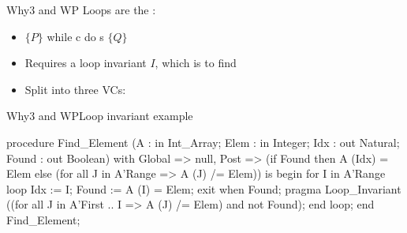 \documentclass{beamer}
\begin{document}
\begin{frame}{Why3 and WP}
  Loops are the :
  \begin{itemize}
  \item $\{ P \}$ while c do s $\{ Q \}$
  \pause
  \item Requires a loop invariant $I$, which is  to find
  \item Split into three VCs:
  \end{itemize}

  \begin{center}
  \end{center}
\end{frame}

\begin{frame}[fragile]{Why3 and WP}{Loop invariant example}
  \begin{pxcode}[language=SPARK,gobble=3]
   procedure Find_Element (A     : in     Int_Array;
                           Elem  : in     Integer;
                           Idx   :    out Natural;
                           Found :    out Boolean)
   with
      Global => null,
      Post   => (if Found
                 then A (Idx) = Elem
                 else (for all J in A'Range => A (J) /= Elem))
   is
   begin
      for I in A'Range loop
         Idx   := I;
         Found := A (I) = Elem;
         exit when Found;
         pragma Loop_Invariant
           ((for all J in A'First .. I => A (J) /= Elem)
            and not Found);
      end loop;
   end Find_Element;
  \end{pxcode}
\end{frame}


\end{document}

